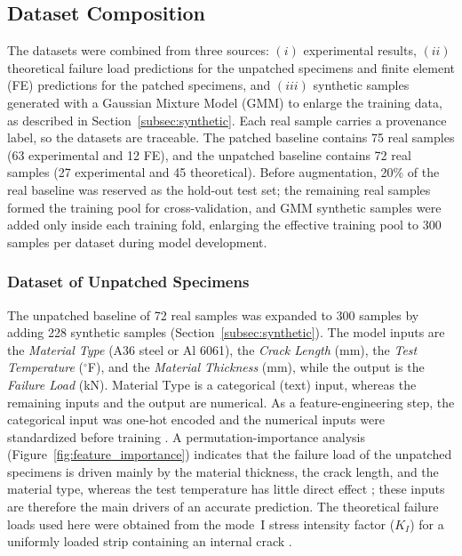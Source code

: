 \documentclass[journal,article,submit,pdftex,moreauthors]{Definitions/mdpi}
\begin{document}
\subsection{Dataset Composition}
The datasets were combined from three sources: $(i)$ experimental results, $(ii)$ theoretical failure load predictions for the unpatched specimens and finite element (FE) predictions for the patched specimens, and $(iii)$ synthetic samples generated with a Gaussian Mixture Model (GMM) to enlarge the training data, as described in Section~\ref{subsec:synthetic}. Each real sample carries a provenance label, so the datasets are traceable. The patched baseline contains 75 real samples (63 experimental and 12 FE), and the unpatched baseline contains 72 real samples (27 experimental and 45 theoretical). Before augmentation, 20\% of the real baseline was reserved as the hold-out test set; the remaining real samples formed the training pool for cross-validation, and GMM synthetic samples were added only inside each training fold, enlarging the effective training pool to 300 samples per dataset during model development.

\subsubsection{Dataset of Unpatched Specimens}
The unpatched baseline of 72 real samples was expanded to 300 samples by adding 228 synthetic samples (Section~\ref{subsec:synthetic}). The model inputs are the \textit{Material Type} (A36 steel or Al 6061), the \textit{Crack Length} (mm), the \textit{Test Temperature} ($^\circ$F), and the \textit{Material Thickness} (mm), while the output is the \textit{Failure Load} (kN). Material Type is a categorical (text) input, whereas the remaining inputs and the output are numerical. As a feature-engineering step, the categorical input was one-hot encoded and the numerical inputs were standardized before training \cite{pedregosa2011scikit}. A permutation-importance analysis (Figure~\ref{fig:feature_importance}) indicates that the failure load of the unpatched specimens is driven mainly by the material thickness, the crack length, and the material type, whereas the test temperature has little direct effect \cite{breiman2001random}; these inputs are therefore the main drivers of an accurate prediction. The theoretical failure loads used here were obtained from the mode~I stress intensity factor ($K_I$) for a uniformly loaded strip containing an internal crack \cite{Erdogan1975}.
\end{document}
